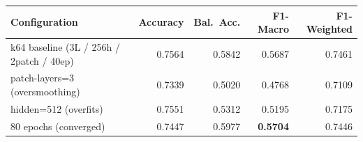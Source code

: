 \begin{tabular}{lrrrr}
\toprule
Configuration & Accuracy & Bal.\ Acc. & F1-Macro & F1-Weighted \\
\midrule
k64 baseline (3L / 256h / 2patch / 40ep) & 0.7564 & 0.5842 & 0.5687 & 0.7461 \\ \midrule
patch-layers=3 (oversmoothing) & 0.7339 & 0.5020 & 0.4768 & 0.7109 \\
hidden=512 (overfits) & 0.7551 & 0.5312 & 0.5195 & 0.7175 \\
80 epochs (converged) & 0.7447 & 0.5977 & \textbf{0.5704} & 0.7446 \\
\bottomrule
\end{tabular}